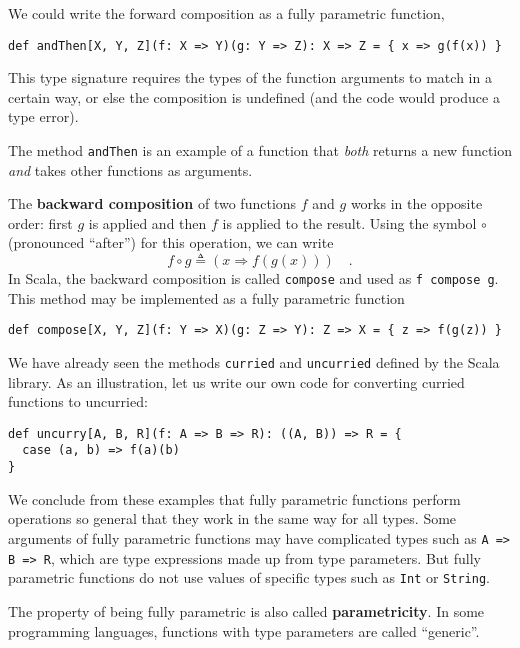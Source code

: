 We could write the forward composition as a fully parametric function,
\begin{lstlisting}
def andThen[X, Y, Z](f: X => Y)(g: Y => Z): X => Z = { x => g(f(x)) }
\end{lstlisting}
This type signature requires the types of the function arguments to
match in a certain way, or else the composition is undefined (and
the code would produce a type error).

The method \lstinline!andThen! is an example of a function that \emph{both}
returns a new function \emph{and} takes other functions as arguments.

The \textbf{backward composition} of
two functions $f$ and $g$ works in the opposite order: first $g$
is applied and then $f$ is applied to the result. Using the symbol
$\circ$ (pronounced ``after'') for this operation, we can write
\begin{equation}
f\circ g\triangleq\left(x\Rightarrow f(g(x))\right)\quad.\label{eq:def-of-backward-composition}
\end{equation}
In Scala, the backward composition is called \lstinline!compose!
and used as \lstinline!f compose g!. This method may be implemented
as a fully parametric function
\begin{lstlisting}
def compose[X, Y, Z](f: Y => X)(g: Z => Y): Z => X = { z => f(g(z)) }
\end{lstlisting}

We have already seen the methods \lstinline!curried! and \lstinline!uncurried!
defined by the Scala library. As an illustration, let us write our
own code for converting curried functions to uncurried:
\begin{lstlisting}
def uncurry[A, B, R](f: A => B => R): ((A, B)) => R = {
  case (a, b) => f(a)(b)
}
\end{lstlisting}

We conclude from these examples that fully parametric functions perform
operations so general that they work in the same way for all types.
Some arguments of fully parametric functions may have complicated
types such as \lstinline!A => B => R!, which are type expressions
made up from type parameters. But fully parametric functions do not
use values of specific types such as \lstinline!Int! or \lstinline!String!.

The property of being fully parametric is also called \textbf{parametricity}.
In some programming languages, functions with type parameters are
called ``generic''.

